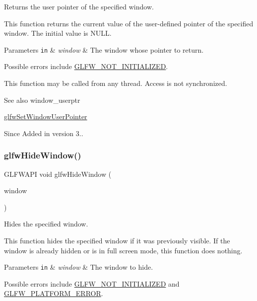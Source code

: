 Returns the user pointer of the specified window. 

This function returns the current value of the user-\/defined pointer of the specified window. The initial value is {\ttfamily N\+U\+LL}.


\begin{DoxyParams}[1]{Parameters}
\mbox{\tt in}  & {\em window} & The window whose pointer to return.\\
\hline
\end{DoxyParams}
Possible errors include \hyperlink{group__errors_ga2374ee02c177f12e1fa76ff3ed15e14a}{G\+L\+F\+W\+\_\+\+N\+O\+T\+\_\+\+I\+N\+I\+T\+I\+A\+L\+I\+Z\+ED}.

This function may be called from any thread. Access is not synchronized.

\begin{DoxySeeAlso}{See also}
window\+\_\+userptr 

\hyperlink{group__window_gacc9e68faee3c1763b54cd9bc405cf43e}{glfw\+Set\+Window\+User\+Pointer}
\end{DoxySeeAlso}
\begin{DoxySince}{Since}
Added in version 3.. 
\end{DoxySince}
\mbox{\label{group__window_gaa17e287d521544bdeceafa09ac036e20}} 
\subsubsection{\texorpdfstring{glfw\+Hide\+Window()}{glfwHideWindow()}}
{\footnotesize\ttfamily G\+L\+F\+W\+A\+PI void glfw\+Hide\+Window (\begin{DoxyParamCaption}\item[{\hyperlink{group__window_ga3c96d80d363e67d13a41b5d1821f3242}{G\+L\+F\+Wwindow} $\ast$}]{window }\end{DoxyParamCaption})}



Hides the specified window. 

This function hides the specified window if it was previously visible. If the window is already hidden or is in full screen mode, this function does nothing.


\begin{DoxyParams}[1]{Parameters}
\mbox{\tt in}  & {\em window} & The window to hide.\\
\hline
\end{DoxyParams}
Possible errors include \hyperlink{group__errors_ga2374ee02c177f12e1fa76ff3ed15e14a}{G\+L\+F\+W\+\_\+\+N\+O\+T\+\_\+\+I\+N\+I\+T\+I\+A\+L\+I\+Z\+ED} and \hyperlink{group__errors_gad44162d78100ea5e87cdd38426b8c7a1}{G\+L\+F\+W\+\_\+\+P\+L\+A\+T\+F\+O\+R\+M\+\_\+\+E\+R\+R\+OR}.

